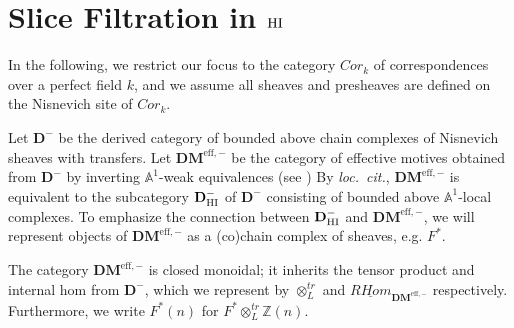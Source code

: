 




\newcommand{\D}{\mathbf{D}}
\newcommand{\DM}{\mathbf{DM}^{\mathrm{eff}}}
\newcommand{\DMm}{\mathbf{DM}^{\mathrm{eff},-}}
\newcommand{\A}{\mathbb{A}^1}
\newcommand{\Gm}{\mathbb{A}^1 \setminus \{0\}}
\newcommand{\tDM}{\otimes_{L}^{tr}}
\newcommand{\homDM}{\mathrm{Hom}_{\DMm}}
\newcommand{\rhomDM}{\underline{RHom}_{\DMm}}
\newcommand{\rhom}{\underline{RHom}_{\D^-}}
\renewcommand{\H}{\mathbf{H}}
\newcommand{\tHI}{\otimes^{\mathrm{Htr}}}
\newcommand{\homHI}{\mathrm{Hom}_{\HI}}
\newcommand{\ihomHI}{\underline{Hom}_{\HI}}
\newcommand{\Ox}{\mathcal{O}^{\times}}
\newcommand{\Z}{\mathbb{Z}}
\newcommand{\slice}[1]{\nu^{#1}}
\newcommand{\anis}{a_{\mathrm{Nis}}}
\newcommand{\sliceHI}{\sigma}
\newcommand{\SliceHI}{\Sigma}

\section{Slice Filtration in $\mathrm{HI}$}

\noindent In the following, we restrict our focus to the category 
$Cor_k$ of correspondences over a perfect field $k$, and we assume 
all sheaves and presheaves are defined on the Nisnevich site of 
$Cor_k$.

Let $\D^-$ be the derived category of bounded above chain 
complexes of Nisnevich sheaves with transfers. Let $\DMm$ be
the category of effective motives obtained from $\D^-$ by 
inverting $\A$-weak equivalences (see \cite{MVW}) By \emph{loc.\ cit.}, $\DMm$ is 
equivalent to the subcategory $\D_{\HI}^-$ of $\D^-$ consisting of 
bounded above $\A$-local complexes. To emphasize the connection
between $\D_{\HI}^-$ and $\DMm$, we will represent objects of
$\DMm$ as a (co)chain complex of sheaves, e.g. $F^*$.

The category $\DMm$ is closed monoidal; it inherits the tensor
product and internal hom from $\D^-$, which we represent by
$\tDM$ and $\rhomDM$ respectively. Furthermore, we write $F^*(n)$ for
$F^* \tDM \Z(n)$.

